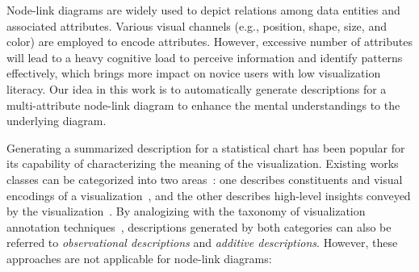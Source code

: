 \maketitle
Node-link diagrams are widely used to depict relations among data entities and associated attributes. 
Various visual channels (e.g., position, shape, size, and color) are employed to encode attributes.
However, excessive number of attributes will lead to a heavy cognitive load 
to perceive information and identify patterns effectively, which brings more impact on novice users with low visualization literacy.
Our idea in this work is to automatically generate descriptions for a multi-attribute node-link 
diagram to enhance the mental understandings to the underlying diagram. 


Generating a summarized description for 
a statistical chart has been popular for its capability of characterizing the meaning of the visualization. 
Existing works 
classes 
can be categorized into two areas~\cite{DBLP:conf/inlg/ObeidH20}: one describes constituents and visual encodings of a  visualization~\cite{DBLP:journals/coling/MittalMCR98, DBLP:journals/tochi/FerresLST13}, and the other describes high-level insights conveyed by the visualization~\cite{DBLP:conf/apvis/LiuXHWY20, DBLP:conf/inlg/ObeidH20}. By analogizing with the taxonomy of visualization annotation techniques~\cite{DBLP:conf/chi/HullmanDA13}, descriptions generated by 
both 
categories 
can also be referred to \textit{observational descriptions} and \textit{additive descriptions}. 
However, these approaches are not applicable for node-link diagrams:

